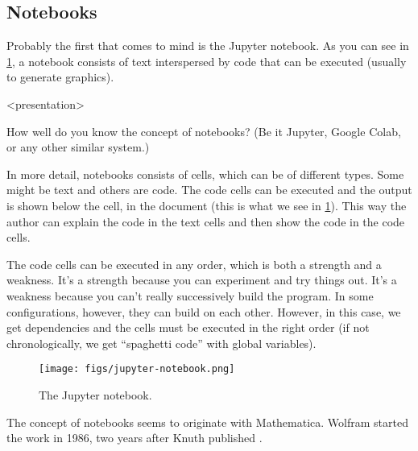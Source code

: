 \subsection{Notebooks}

Probably the first that comes to mind is the Jupyter notebook.
As you can see in \cref{fig:jupyter}, a notebook consists of text interspersed 
by code that can be executed (usually to generate graphics).

\begin{frame}<presentation>
\begin{activity}\label{AnalyseNotebooks}
How well do you know the concept of notebooks?
(Be it Jupyter, Google Colab, or any other similar system.)
\end{activity}
\end{frame}

In more detail, notebooks consists of cells, which can be of different types.
Some might be text and others are code.
The code cells can be executed and the output is shown below the cell, in the 
document (this is what we see in \cref{fig:jupyter}).
This way the author can explain the code in the text cells and then show the 
code in the code cells.

The code cells can be executed in any order, which is both a strength and a 
weakness.
It's a strength because you can experiment and try things out.
It's a weakness because you can't really successively build the program.
In some configurations, however, they can build on each other.
However, in this case, we get dependencies and the cells must be executed in 
the right order (if not chronologically, we get \enquote{spaghetti code} with 
global variables).

\begin{frame}
\begin{figure}[b]
  \texttt{[image: figs/jupyter-notebook.png]}
  \caption{\label{fig:jupyter}%
    The Jupyter notebook.
  }
\end{figure}
\end{frame}

\begin{frame}
\begin{remark}
  The concept of notebooks seems to originate with 
  Mathematica\autocite{Wolfram1988}.
  Wolfram started the work in 1986, two years after Knuth published 
  .
\end{remark}
\end{frame}

